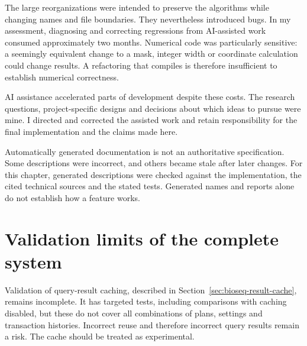 The large reorganizations were intended to preserve the algorithms while
changing names and file boundaries. They nevertheless introduced bugs.
In my assessment, diagnosing and correcting regressions from AI-assisted
work consumed approximately two months. Numerical code was particularly
sensitive: a seemingly equivalent change to a mask, integer width or
coordinate calculation could change results. A refactoring that compiles
is therefore insufficient to establish numerical correctness.

AI assistance accelerated parts of development despite these costs. The
research questions, project-specific designs and decisions about which
ideas to pursue were mine. I directed and corrected the assisted work and
retain responsibility for the final implementation and the claims made here.

Automatically generated documentation is not an authoritative specification.
Some descriptions were incorrect, and others became stale after later
changes. For this chapter, generated descriptions were checked against the
implementation, the cited technical sources and the stated tests. Generated
names and reports alone do not establish how a feature works.

\section{Validation limits of the complete system}
\label{sec:arch-validation-limits}

Validation of query-result caching, described in
Section~\ref{sec:bioseq-result-cache}, remains incomplete. It has targeted tests,
including comparisons with caching disabled, but these do not cover all
combinations of plans, settings and transaction histories. Incorrect reuse
and therefore incorrect query results remain a risk. The cache should be
treated as experimental.
